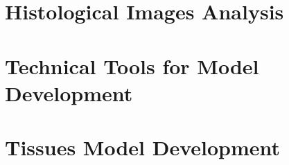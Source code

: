 \documentclass[12pt,a4paper]{report}
\begin{document}




\tableofcontents{}


\clearpage

\chapter{Histological Images Analysis}
    
    
    \clearpage
    
    \clearpage
    
    \clearpage

\chapter{Technical Tools for Model Development} \label{sec:tech_tool}
    
    
    \clearpage
%
\chapter{Tissues Model Development} \label{sec:models}
    
    
    \clearpage
    
    \clearpage


\clearpage


\end{document}
